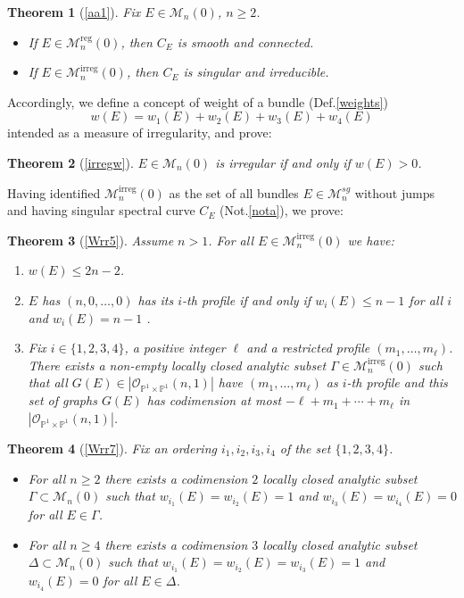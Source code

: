 \documentclass[
  a4paper, 
  reqno, 
  oneside, 
  11pt
]{amsart}
\theoremstyle{plain}	%
\newtheorem*{theorem*}{Theorem}
\theoremstyle{mydef} %
\theoremstyle{remark}
\theoremstyle{definition}
\theoremstyle{remark}
\DeclareMathOperator{\reg}{reg}
\DeclareMathOperator{\irreg}{irreg}
\begin{document}
\begin{theorem*}[\ref{aa1}]
Fix $E\in \mathcal M_n(0)$, $n\ge 2$. 
\begin{itemize}
\item[(a)] If $E\in \mathcal M_n^{\reg}(0)$, then $C_E$ is smooth and connected.
\item[(b)] If $E\in \mathcal M_n^{\irreg}(0)$, then $C_E$ is singular and irreducible.
\end{itemize}
\end{theorem*}
 Accordingly,  
  we define a concept of weight of a bundle
(Def.\thinspace \ref{weights}) 
$$w(E) = w_1(E)+w_2(E)+w_3(E)+w_4(E)$$
intended as a measure 
of irregularity, and prove:
\begin{theorem*}[\ref{irregw}] $E\in \mathcal M_n(0)$ is irregular if and only if $w(E)>0$.
\end{theorem*}

Having identified  $\mathcal M_n^{\irreg}(0)$ as the set of all bundles $E \in \mathcal M_n^{sg}$ without jumps and  
having singular spectral curve $C_E$ (Not.\thinspace \ref{nota}), we prove:

\begin{theorem*}[\ref{Wrr5}]
Assume $n>1$. For all $E\in \mathcal M_n^{\irreg}(0)$  we have:
\begin{enumerate}
\item $w(E)\le 2n-2$.
\item $E$ has $(n, 0,\dots, 0)$ has its $i$-th profile if and only if $w_i(E)\le n-1$ for all $i$ and $w_i(E)=n-1$ .
\item Fix $i\in \{1,2,3,4\}$, a positive integer $\ell$ and a restricted profile $(m_1,\dots ,m_\ell)$. 
There exists a non-empty locally closed analytic subset $\Gamma \in \mathcal M_n^{\irreg}(0)$
such that  all  $G(E)\in |\mathcal O_{\mathbb P^1\times \mathbb P^1}(n,1)|$ have   $(m_1,\dots ,m_\ell)$ as $i$-th profile
and this set of graphs $G(E)$  has codimension at most $-\ell +m_1+\cdots +m_\ell$ in $|\mathcal O_{\mathbb P^1\times \mathbb P^1}(n,1)|$.
\end{enumerate}
\end{theorem*}

\begin{theorem*}[\ref{Wrr7}]
Fix an ordering $i_1,i_2,i_3,i_4$ of the set $\{1,2,3,4\}$.
\begin{itemize}
\item[(a)] For all $n\ge 2$ there exists  a codimension $2$ locally closed analytic subset $\Gamma \subset \mathcal M_n(0)$ such that $w_{i_1}(E)=w_{i_2}(E)=1$ and $w_{i_3}(E)=w_{i_4}(E)=0$ for all $E\in \Gamma$.

\item[(b)] For all $n\ge 4$ there exists  a codimension $3$ locally closed analytic subset $\Delta \subset \mathcal M_n(0)$ such that $w_{i_1}(E)=w_{i_2}(E)=w_{i_3}(E)=1$ and $w_{i_4}(E)=0$ for all $E\in \Delta$.
\end{itemize}
\end{theorem*}
\end{document}
